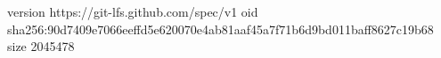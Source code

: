 version https://git-lfs.github.com/spec/v1
oid sha256:90d7409e7066eeffd5e620070e4ab81aaf45a7f71b6d9bd011baff8627c19b68
size 2045478
